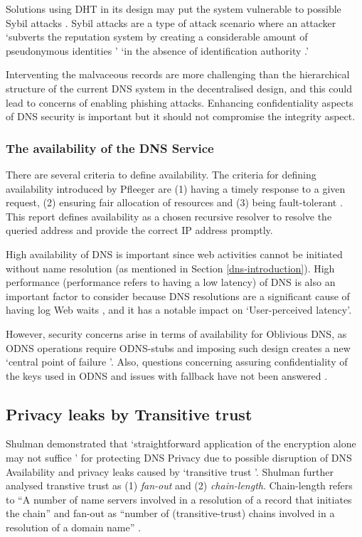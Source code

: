 Solutions using DHT in its design may put the system vulnerable to possible Sybil attacks \cite{6503215, SitE2002Scfp}.
Sybil attacks are a type of attack scenario where an attacker `subverts the reputation system by creating a considerable amount of pseudonymous identities \cite{TRIFA20141135}' `in the absence of identification authority \cite{douceur2002sybil}.'

Interventing the malvaceous records are more challenging than the hierarchical structure of the current DNS system in the decentralised design, and this could lead to concerns of enabling phishing attacks.
Enhancing confidentiality aspects of DNS security is important but it should not compromise the integrity aspect.



\subsubsection{The availability of the DNS Service}
There are several criteria to define availability. The criteria for defining availability introduced by Pfleeger are (1) having a timely response to a given request, (2) ensuring fair allocation of resources and (3) being fault-tolerant \cite{securityincomputing}.
This report defines availability as a chosen recursive resolver to resolve the queried address and provide the correct IP address promptly.

High availability of DNS is important since web activities cannot be initiated without name resolution (as mentioned in Section \ref{dns-introduction}). High performance (performance refers to having a low latency) of DNS is also an important factor to consider because DNS resolutions are a significant cause of having log Web waits \cite{cohen2003proactive, jung2002dns}, and it has a notable impact on `User-perceived latency'.

However, security concerns arise in terms of availability for Oblivious DNS, as ODNS operations require ODNS-stubs and imposing such design creates a new `central point of failure \cite{minutes-102-dprive}'.
Also, questions concerning assuring confidentiality of the keys used in ODNS and issues with fallback have not been answered \cite{minutes-102-dprive}.



\subsection{Privacy leaks by Transitive trust}
Shulman demonstrated that `straightforward application of the encryption alone may not suffice \cite{Shulman:2014}' for protecting DNS Privacy due to possible disruption of DNS Availability and privacy leaks caused by `transitive trust \cite{Ramasubramanian:2005}'.
Shulman further analysed transtive trust as (1) \textit{fan-out} and (2) \textit{chain-length}.
Chain-length refers to ``A number of name servers involved in a resolution of a record that initiates the chain'' and fan-out as ``number of (transitive-trust) chains involved in a resolution of a domain name'' \cite{Shulman:2014}.

